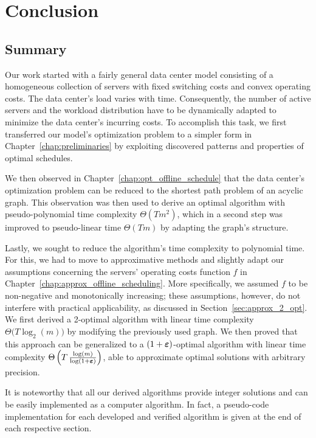
\chapter{Conclusion}\label{chap:conclusion}

\section{Summary}
Our work started with a fairly general data center model consisting of a homogeneous collection of servers with fixed switching costs and convex operating costs. The data center's load varies with time. Consequently, the number of active servers and the workload distribution have to be dynamically adapted to minimize the data center's incurring costs. To accomplish this task, we first transferred our model's optimization problem to a simpler form in Chapter~\ref{chap:preliminaries} by exploiting discovered patterns and properties of optimal schedules. 

We then observed in Chapter~\ref{chap:opt_offline_schedule} that the data center's optimization problem can be reduced to the shortest path problem of an acyclic graph. This observation was then used to derive an optimal algorithm with pseudo-polynomial time complexity $\Theta(Tm^2)$, which in a second step was improved to pseudo-linear time $\Theta(Tm)$ by adapting the graph's structure.

Lastly, we sought to reduce the algorithm's time complexity to polynomial time. For this, we had to move to approximative methods and slightly adapt our assumptions concerning the servers' operating costs function $f$ in Chapter~\ref{chap:approx_offline_scheduling}. More specifically, we assumed $f$ to be non-negative and monotonically increasing; these assumptions, however, do not interfere with practical applicability, as discussed in Section~\ref{sec:approx_2_opt}. We first derived a 2-optimal algorithm with linear time complexity $\Theta\bigl(T\log_2(m)\bigr)$ by modifying the previously used graph. We then proved that this approach can be generalized to a $(1+\boldsymbol\varepsilon)$-optimal algorithm with linear time complexity $\Theta\left(T\,\frac{\log(m)}{\log(1+\boldsymbol\varepsilon)}\right)$, able to approximate optimal solutions with arbitrary precision.

It is noteworthy that all our derived algorithms provide integer solutions and can be easily implemented as a computer algorithm. In fact, a pseudo-code implementation for each developed and verified algorithm is given at the end of each respective section.

